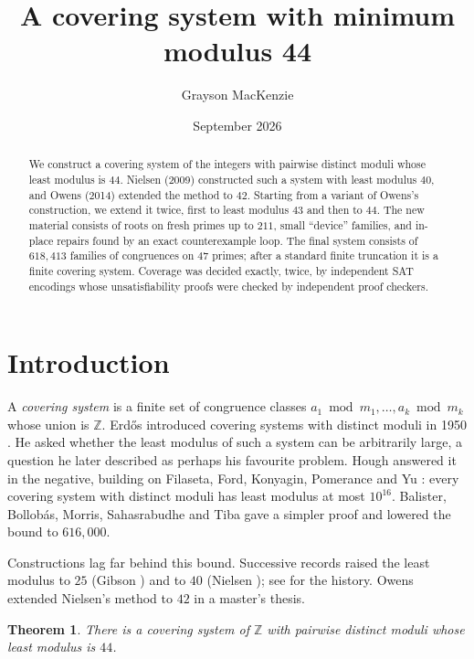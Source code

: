 \documentclass[11pt]{amsart}
\title{A covering system with minimum modulus 44}
\author{Grayson MacKenzie}
\date{September 2026}
\newtheorem{theorem}{Theorem}
\theoremstyle{definition}
\theoremstyle{remark}
\newcommand{\Z}{\mathbb{Z}}
\begin{document}
\begin{abstract}
We construct a covering system of the integers with pairwise distinct moduli whose least modulus is $44$. Nielsen (2009) constructed such a system with least modulus $40$, and Owens (2014) extended the method to $42$.
Starting from a variant of Owens's construction, we extend it twice, first to least modulus $43$ and then to $44$. The new material
consists of roots on fresh primes up to $211$, small ``device'' families, and in-place repairs found by an exact
counterexample loop. The final system consists of $618{,}413$ families of congruences on $47$ primes; after a
standard finite truncation it is a finite covering system. Coverage was decided exactly, twice, by independent SAT
encodings whose unsatisfiability proofs were checked by independent proof checkers.
\end{abstract}

\maketitle

\section{Introduction}

A \emph{covering system} is a finite set of congruence classes $a_1 \bmod m_1, \dots, a_k \bmod m_k$ whose union is
$\Z$. Erdős introduced covering systems with distinct moduli in 1950 \cite{Erdos50}. He asked whether the least
modulus of such a system can be arbitrarily large, a question he later described as perhaps his favourite problem.
Hough \cite{Hough15} answered it in the negative, building on Filaseta, Ford, Konyagin, Pomerance and Yu
\cite{FFKPY07}: every covering system with distinct moduli has least modulus at most $10^{16}$. Balister, Bollobás,
Morris, Sahasrabudhe and Tiba \cite{BBMST22} gave a simpler proof and lowered the bound to $616{,}000$.

Constructions lag far behind this bound. Successive records raised the least modulus to $25$ (Gibson
\cite{Gibson09}) and to $40$ (Nielsen \cite{Nielsen09}); see \cite{Nielsen09} for the history. Owens
\cite{Owens14} extended Nielsen's method to $42$ in a master's thesis.

\begin{theorem}\label{thm:main}
There is a covering system of $\Z$ with pairwise distinct moduli whose least modulus is $44$.
\end{theorem}
\end{document}
